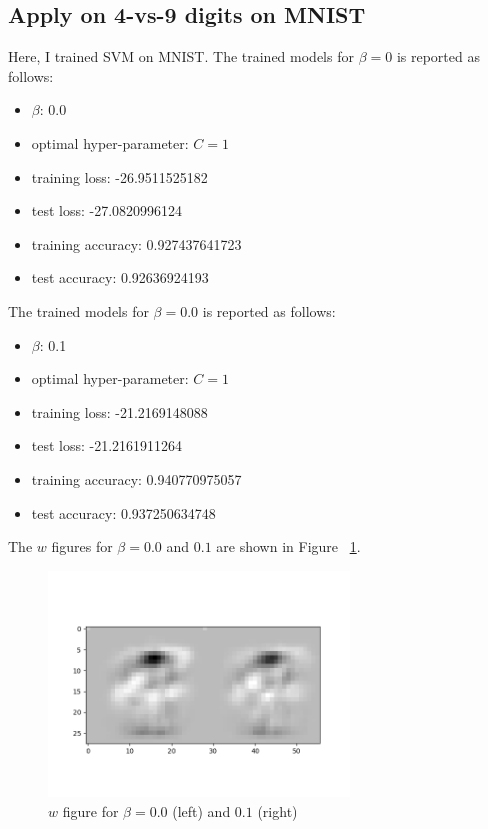 \documentclass[a4paper]{article}
\begin{document}
\subsection{Apply on 4-vs-9 digits on MNIST}

Here, I trained SVM on MNIST. The trained models for $\beta=0$ is reported as follows:

\begin{itemize}
    \item $\beta$: 0.0
    \item optimal hyper-parameter: $C=1$
    \item training loss: -26.9511525182
    \item test loss: -27.0820996124
    \item training accuracy: 0.927437641723
    \item test accuracy: 0.92636924193
\end{itemize}

The trained models for $\beta=0.0$ is reported as follows:

\begin{itemize}
    \item $\beta$: 0.1
    \item optimal hyper-parameter: $C=1$
    \item training loss: -21.2169148088
    \item test loss: -21.2161911264
    \item training accuracy: 0.940770975057
    \item test accuracy: 0.937250634748
\end{itemize}

The $w$ figures for $\beta=0.0$ and $0.1$ are shown in Figure ~\ref{fig: SVM}.

\begin{figure}[htbp]
\centering
\includegraphics[width = 8cm]{SVM}
\caption{$w$ figure for $\beta=0.0$ (left) and $0.1$ (right)}
\label{fig: SVM}
\end{figure}



\end{document}

